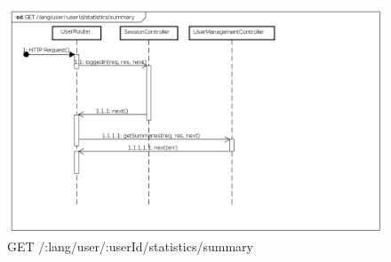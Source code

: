 \begin{itemize}
\begin{figure}[ht]
	\centering
	\includegraphics[scale=0.40]{UML/DiagrammiDiSequenza/Back-end/GET_LangUserUserIdStatisticsSummaryFailure.png}
	\caption{GET /:lang/user/:userId/statistics/summary}
\end{figure}
\FloatBarrier

\end{itemize}

